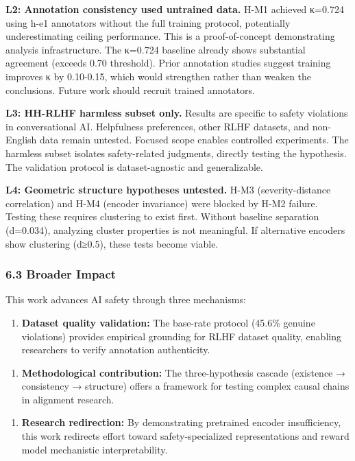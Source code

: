 \textbf{L2: Annotation consistency used untrained data.} H-M1 achieved κ=0.724 using h-e1 annotators without the full training protocol, potentially underestimating ceiling performance. This is a proof-of-concept demonstrating analysis infrastructure. The κ=0.724 baseline already shows substantial agreement (exceeds 0.70 threshold). Prior annotation studies suggest training improves κ by 0.10-0.15, which would strengthen rather than weaken the conclusions. Future work should recruit trained annotators.

\textbf{L3: HH-RLHF harmless subset only.} Results are specific to safety violations in conversational AI. Helpfulness preferences, other RLHF datasets, and non-English data remain untested. Focused scope enables controlled experiments. The harmless subset isolates safety-related judgments, directly testing the hypothesis. The validation protocol is dataset-agnostic and generalizable.

\textbf{L4: Geometric structure hypotheses untested.} H-M3 (severity-distance correlation) and H-M4 (encoder invariance) were blocked by H-M2 failure. Testing these requires clustering to exist first. Without baseline separation (d=0.034), analyzing cluster properties is not meaningful. If alternative encoders show clustering (d≥0.5), these tests become viable.

\subsubsection{6.3 Broader Impact}

This work advances AI safety through three mechanisms:

\begin{enumerate}
\item \textbf{Dataset quality validation:} The base-rate protocol (45.6\% genuine violations) provides empirical grounding for RLHF dataset quality, enabling researchers to verify annotation authenticity.
\end{enumerate}

\begin{enumerate}
\item \textbf{Methodological contribution:} The three-hypothesis cascade (existence → consistency → structure) offers a framework for testing complex causal chains in alignment research.
\end{enumerate}

\begin{enumerate}
\item \textbf{Research redirection:} By demonstrating pretrained encoder insufficiency, this work redirects effort toward safety-specialized representations and reward model mechanistic interpretability.
\end{enumerate}

